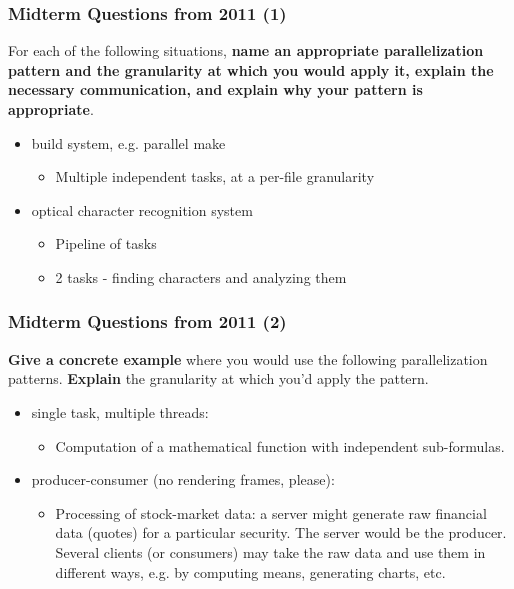 \begin{frame}
  \frametitle{Midterm Questions from 2011 (1)}


  For each of the following situations, {\bf name an appropriate parallelization
  pattern and the granularity at which you would apply it, explain the necessary
  communication, and explain why your pattern is appropriate}.
  \begin{itemize}
  \item build system, e.g. parallel make
    \begin{itemize}
      \item<2-> Multiple independent tasks, at a per-file granularity
    \end{itemize}
  \item optical character recognition system
    \begin{itemize}
      \item<2-> Pipeline of tasks
      \item<2-> 2 tasks - finding characters and analyzing them
    \end{itemize}
  \end{itemize}

\end{frame}

\begin{frame}
  \frametitle{Midterm Questions from 2011 (2)}


  {\bf Give a concrete example} where you would use the following
  parallelization patterns. {\bf Explain} the granularity at which you'd apply
  the pattern.
  \begin{itemize}
    \item single task, multiple threads:
    \begin{itemize}
      \item<2-> Computation of a mathematical function with independent
        sub-formulas.
    \end{itemize}
    \item producer-consumer (no rendering frames, please):
    \begin{itemize}
      \item<2-> Processing of stock-market data:
        a server might generate raw financial data (quotes) for a
        particular security. The server would be the producer. Several clients
        (or consumers) may take the raw data and use them in different ways, e.g. by computing means, generating charts, etc.
    \end{itemize}
  \end{itemize}
 
\end{frame}



